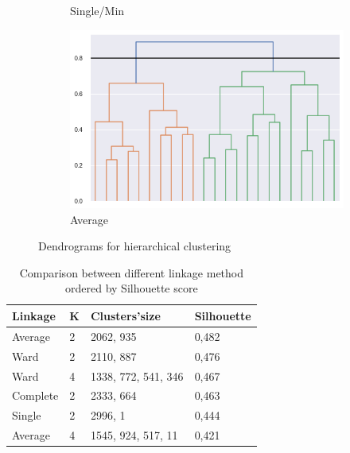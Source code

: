 \begin{figure}[h]
\begin{subfigure}[b]{0.48\textwidth}
		\caption{Single/Min}
  \end{subfigure}
	\begin{subfigure}[b]{0.48\textwidth}
		\includegraphics[width=\textwidth]{plots/hierarchical/hierarchical_dendogram_average.png}
		\caption{Average}
	\end{subfigure}
	\caption{Dendrograms for hierarchical clustering}
	\label{figure:hierarchical_dendrograms}
\end{figure}

\begin{table}[h]
\centering
\begin{tabular}{|l|l|l|l|}
\hline
\textbf{Linkage} & \textbf{K} & \textbf{Clusters'size} & \textbf{Silhouette} \\ \hline\hline
Average          & 2          & 2062, 935              & 0,482               \\ \hline
Ward             & 2          & 2110, 887              & 0,476               \\ \hline
Ward             & 4          & 1338, 772, 541, 346    & 0,467               \\ \hline
Complete         & 2          & 2333, 664              & 0,463               \\ \hline
Single           & 2          & 2996, 1                & 0,444               \\ \hline
Average          & 4          & 1545,  924,  517, 11   & 0,421               \\ \hline
\end{tabular}
\caption{Comparison between different linkage method ordered by Silhouette score}
\label{tab:hierarchical-table}
\end{table}

